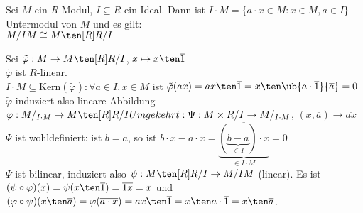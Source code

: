 \begin{Prop}
  Sei $M$ ein $R$-Modul, $I \subseteq R$ ein Ideal. Dann ist $I \cdot M = 
  \{ a \cdot x \in M: x \in M, a \in I \}$ Untermodul von $M$ und es gilt: \\
  $M/IM \cong M \ten[R] R/I$
\end{Prop}

\begin{Bew}
  Sei $\tilde{\varphi}: M \rightarrow M \ten[R] R/I$, 
  $ x \mapsto x \ten \overline 1$\\
  $\tilde{\varphi}$  ist $R$-linear.\\
  $I \cdot M \subseteq \mbox{Kern}(\tilde{\varphi}): \forall a \in I, x \in M$ ist
  $\tilde{\varphi}(ax) = ax \ten \overline 1 = x \ten \ub{ a \cdot \overline 1
  }{\overline a} = 0$\\
  $\tilde{\varphi}$ induziert also lineare Abbildung\\
  $\varphi: M/_{I \cdot M} \rightarrow M \ten[R] R/I\\
  Umgekehrt: \Psi: M \times R/I \rightarrow M /_{I \cdot M}$, $(x, \overline a) \rightarrow \overline{ax}$ \\
  $\Psi$ ist wohldefiniert: ist $\overline b = \overline a$, so ist $\overline{b \cdot x} - \overline{a \cdot x} =
  \overline{ \underbrace {( \underbrace{b-a}_{\in I}) \cdot x}_{ \in I \cdot M}} =0$\\
  $\Psi$ ist bilinear, induziert also $\psi: M \ten[R] R/I \to M/IM$ (linear). Es ist 
  $(\psi \circ \varphi)(\overline x )= \psi(x \ten \overline 1 ) =
  \overline{1x} = \overline x$ und
  $(\varphi \circ \psi)(x \ten \overline a ) = \varphi(\overline{a \cdot x }) =
  ax \ten \overline 1 = x \ten a\cdot \overline 1 = x \ten \overline a$.
\end{Bew}
